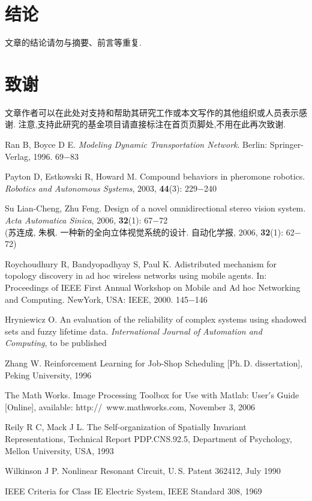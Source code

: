 \documentclass[fontset=mac]{aas}
\begin{document}
\section{结论}

文章的结论请勿与摘要、前言等重复.

\section*{致谢}

文章作者可以在此处对支持和帮助其研究工作或本文写作的其他组织或人员表示感谢.
注意,支持此研究的基金项目请直接标注在首页页脚处,不用在此再次致谢.

\begin{thebibliography}{99}
 Ran B, Boyce D E. {\sl Modeling Dynamic Transportation Network}.
Berlin: Springer-Verlag, 1996. 69$-$83

 Payton D, Estkowski R, Howard M. Compound behaviors in pheromone
robotics. {\sl Robotics and Autonomous Systems}, 2003, {\bf 44}(3):
229$-$240

 Su Lian-Cheng, Zhu Feng. Design of a novel omnidirectional
stereo vision system. {\sl  Acta Automatica Sinica}, 2006,
{\bf 32}(1): 67$-$72\\
(苏连成, 朱枫. 一种新的全向立体视觉系统的设计. 自动化学报, 2006,
{\bf 32}(1): 62$-$72)

 Roychoudhury R, Bandyopadhyay S, Paul K. Adistributed mechanism
for topology discovery in ad hoc wireless networks using mobile
agents. In: Proceedings of IEEE First Annual Workshop on Mobile and
Ad hoc Networking and Computing. NewYork, USA: IEEE, 2000. 145$-$146

 Hryniewicz O. An evaluation of the reliability of complex
systems using shadowed sets and fuzzy lifetime data. {\sl
International Journal of Automation and Computing}, to be published

 Zhang W. Reinforcement Learning for Job-Shop Scheduling [Ph.\,D.
dissertation], Peking University, 1996

 The Math Works. Image Processing Toolbox for Use with Matlab: User$'$s
Guide [Online], available: http://~www.mathworks.com, November 3,
2006

 Reily R C, Mack J L. The Self-organization of Spatially Invariant
Representations, Technical Report PDP.CNS.92.5, Department of
Psychology, Mellon University, USA, 1993

 Wilkinson J P. Nonlinear Resonant Circuit, U.\,S. Patent 362412, July 1990

 IEEE Criteria for Class IE Electric System, IEEE Standard 308, 1969
\end{thebibliography}
\end{document}
